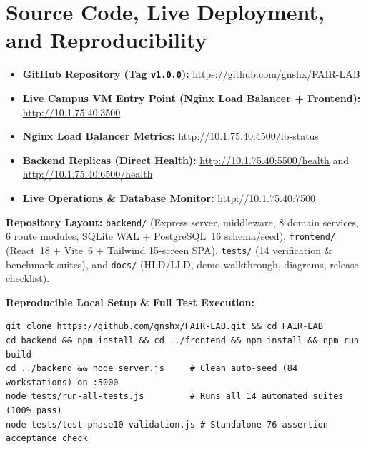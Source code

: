 \documentclass[manuscript,screen,review]{acmart}
\begin{document}
\appendix

\section{Source Code, Live Deployment, and Reproducibility}
\label{app:repo}
\begin{itemize}
  \item \textbf{GitHub Repository (Tag \texttt{v1.0.0}):} \url{https://github.com/gnshx/FAIR-LAB}
  \item \textbf{Live Campus VM Entry Point (Nginx Load Balancer + Frontend):} \url{http://10.1.75.40:3500}
  \item \textbf{Nginx Load Balancer Metrics:} \url{http://10.1.75.40:4500/lb-status}
  \item \textbf{Backend Replicas (Direct Health):} \url{http://10.1.75.40:5500/health} and \url{http://10.1.75.40:6500/health}
  \item \textbf{Live Operations \& Database Monitor:} \url{http://10.1.75.40:7500}
\end{itemize}

\textbf{Repository Layout:} \texttt{backend/} (Express server, middleware, 8 domain services, 6 route modules, SQLite WAL + PostgreSQL~16 schema/seed), \texttt{frontend/} (React~18 + Vite~6 + Tailwind 15-screen SPA), \texttt{tests/} (14 verification \& benchmark suites), and \texttt{docs/} (HLD/LLD, demo walkthrough, diagrams, release checklist).

\textbf{Reproducible Local Setup \& Full Test Execution:}
\begin{verbatim}
git clone https://github.com/gnshx/FAIR-LAB.git && cd FAIR-LAB
cd backend && npm install && cd ../frontend && npm install && npm run build
cd ../backend && node server.js     # Clean auto-seed (84 workstations) on :5000
node tests/run-all-tests.js         # Runs all 14 automated suites (100% pass)
node tests/test-phase10-validation.js # Standalone 76-assertion acceptance check
\end{verbatim}
\end{document}
